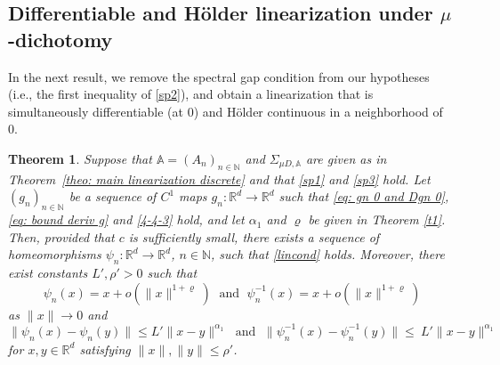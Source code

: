 \documentclass[reqno, a4paper, 10pt]{amsart}
\theoremstyle{plain}
\numberwithin{equation}{section}
\newtheorem{theorem}{Theorem}
\theoremstyle{remark}
\def\N{\mathbb{N}}
\def\R{\mathbb{R}}
\begin{document}
\subsection{Differentiable and H\"older linearization  under $\mu$-dichotomy}
In the next result, we remove the spectral gap condition from our hypotheses (i.e., the first inequality of \eqref{sp2}), and obtain a linearization that is simultaneously differentiable (at 0) and H\"older continuous in a neighborhood of 0.

\begin{theorem}\label{theo: diff+holder linearization}
Suppose that $\mathbb A=(A_n)_{n\in \N}$ and $\Sigma_{\mu D, \mathbb A}$ are given as in Theorem~\ref{theo: main linearization discrete} and that \eqref{sp1} and \eqref{sp3} hold.
Let $(g_n)_{n\in \N}$ be a sequence of $C^1$ maps $g_n\colon \R^d \to \R^d$ such that \eqref{eq: gn 0 and Dgn 0}, \eqref{eq: bound deriv g} and \eqref{4-4-3} hold, and let $\alpha_1$ and $\varrho$ be given in Theorem \ref{t1}.
Then, provided that $c$ is sufficiently small, there exists a sequence of homeomorphisms $\psi_n\colon \mathbb{R}^d\to \mathbb{R}^d$, $n\in \N$, such that \eqref{lincond} holds.
Moreover, there exist constants $ L', \rho'>0$ such that 
\begin{equation}\label{000}
\psi_n(x)=x+ o(\|x\|^{1+\varrho})\; \text{ and }\;
\psi_n^{-1}(x)=x+ o(\|x\|^{1+\varrho})
\end{equation}
as $\|x\|\to 0$ and
\begin{equation}\label{001}
\|\psi_n(x)-\psi_n(y)\|\!\le\!  L'\|x-y\|^{\alpha_1} \; \text{ and }\;
\|\psi_n^{-1}(x)-\psi_n^{-1}(y)\|\!\le\! \ L'  \|x-y\|^{\alpha_1}
\end{equation}
for $x,y\in \mathbb{R}^d$ satisfying $\|x\|,\|y\|\le \rho'$. %
\end{theorem}
\end{document}
